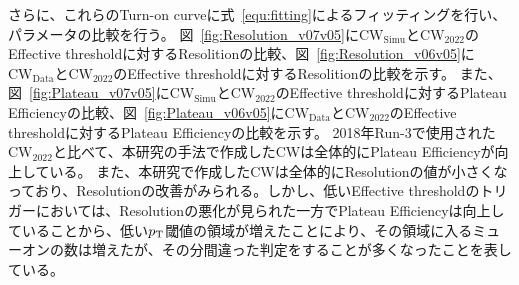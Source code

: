 さらに、これらのTurn-on curveに式~\eqref{equ:fitting}によるフィッティングを行い、パラメータの比較を行う。
図~\ref{fig:Resolution_v07v05}に$\mathrm{CW_{Simu}}$と$\mathrm{CW_{2022}}$のEffective thresholdに対するResolitionの比較、図~\ref{fig:Resolution_v06v05}に$\mathrm{CW_{Data}}$と$\mathrm{CW_{2022}}$のEffective thresholdに対するResolitionの比較を示す。
また、図~\ref{fig:Plateau_v07v05}に$\mathrm{CW_{Simu}}$と$\mathrm{CW_{2022}}$のEffective thresholdに対するPlateau Efficiencyの比較、図~\ref{fig:Plateau_v06v05}に$\mathrm{CW_{Data}}$と$\mathrm{CW_{2022}}$のEffective thresholdに対するPlateau Efficiencyの比較を示す。
2018年Run-3で使用された$\mathrm{CW_{2022}}$と比べて、本研究の手法で作成したCWは全体的にPlateau Efficiencyが向上している。
また、本研究で作成したCWは全体的にResolutionの値が小さくなっており、Resolutionの改善がみられる。しかし、低いEffective thresholdのトリガーにおいては、Resolutionの悪化が見られた一方でPlateau Efficiencyは向上していることから、低い$p_{\rm{T}}$閾値の領域が増えたことにより、その領域に入るミューオンの数は増えたが、その分間違った判定をすることが多くなったことを表している。
